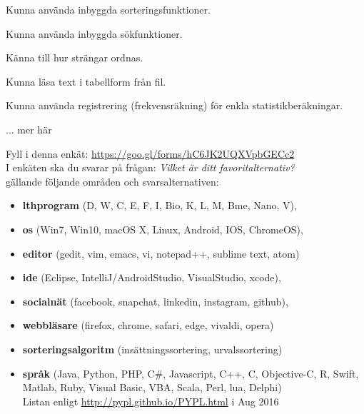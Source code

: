 

\Lab{\LabWeekTEN}

\begin{Goals}
\item Kunna använda inbyggda sorteringsfunktioner.
\item Kunna använda inbyggda sökfunktioner.
\item Känna till hur strängar ordnas.
\item Kunna läsa text i tabellform från fil.
\item Kunna använda registrering (frekvensräkning) för enkla statistikberäkningar.
\item ... \TODO mer här
\end{Goals}

\begin{Preparations}
\item {}
\item {}
\item \ReadTheLab
\item Fyll i denna enkät: \url{https://goo.gl/forms/hC6JK2UQXVpbGECc2}  \\
I enkäten ska du svarar på frågan: \textit{Vilket är ditt favoritalternativ?} \\
gällande följande områden och svarsalternativen:
\begin{itemize}[nolistsep,noitemsep]
\item \textbf{lthprogram} (D, W, C, E, F, I, Bio, K, L, M, Bme, Nano, V), 
\item \textbf{os} (Win7, Win10, macOS X, Linux, Android, IOS, ChromeOS), 
\item \textbf{editor} (gedit, vim, emacs, vi, notepad++, sublime text, atom)
\item \textbf{ide} (Eclipse, IntelliJ/AndroidStudio, VisualStudio, xcode), 
\item \textbf{socialnät} (facebook, snapchat, linkedin, instagram, github), 
\item \textbf{webbläsare} (firefox, chrome, safari, edge, vivaldi, opera)
\item \textbf{sorteringsalgoritm} (insättningssortering, urvalssortering)
\item \textbf{språk} (Java, Python, PHP, C\#, Javascript, C++, C, Objective-C, R, Swift, Matlab, Ruby, Visual Basic, VBA, Scala, Perl, lua, Delphi)  \\
Listan enligt \url{http://pypl.github.io/PYPL.html} i Aug 2016
\end{itemize}
\end{Preparations}


